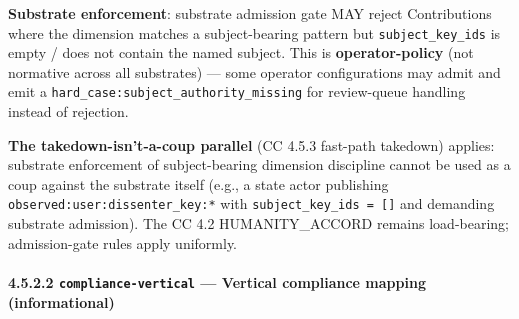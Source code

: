 \documentclass[11pt]{article}
\begin{document}
\textbf{Substrate enforcement}: substrate admission gate MAY reject Contributions where the dimension matches a subject-bearing pattern but \texttt{subject\_key\_ids} is empty / does not contain the named subject. This is \textbf{operator-policy} (not normative across all substrates) — some operator configurations may admit and emit a \texttt{hard\_case:subject\_authority\_missing} for review-queue handling instead of rejection.


\textbf{The takedown-isn't-a-coup parallel} (CC 4.5.3 fast-path takedown) applies: substrate enforcement of subject-bearing dimension discipline cannot be used as a coup against the substrate itself (e.g., a state actor publishing \texttt{observed:user:dissenter\_key:*} with \texttt{subject\_key\_ids = []} and demanding substrate admission). The CC 4.2 HUMANITY\_ACCORD remains load-bearing; admission-gate rules apply uniformly.


\paragraph{4.5.2.2 \texttt{compliance-vertical} — Vertical compliance mapping (informational)}\mbox{}\\
\end{document}
